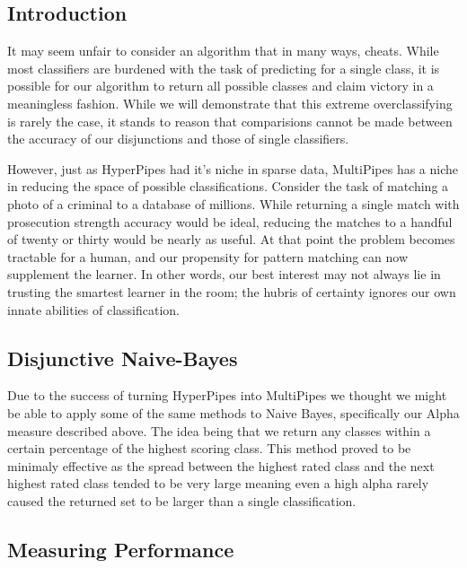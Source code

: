 \subsection{Introduction}
It may seem unfair to consider an algorithm that in many ways, cheats. While most classifiers are burdened with the task of predicting for a single class, it is possible for our algorithm to return all possible classes and claim victory in a meaningless fashion. While we will demonstrate that this extreme overclassifying is rarely the case, it stands to reason that comparisions cannot be made between the accuracy of our disjunctions and those of single classifiers.

However, just as HyperPipes had it's niche in sparse data, MultiPipes has a niche in reducing the space of possible classifications. Consider the task of matching a photo of a criminal to a database of millions. While returning a single match with prosecution strength accuracy would be ideal, reducing the matches to a handful of twenty or thirty would be nearly as useful. At that point the problem becomes tractable for a human, and our propensity for pattern matching can now supplement the learner. In other words, our best interest may not always lie in trusting the smartest learner in the room; the hubris of certainty ignores our own innate abilities of classification.

\subsection{Disjunctive Naive-Bayes}
Due to the success of turning HyperPipes into MultiPipes we thought we might be able to apply some of the same methods to Naive Bayes, specifically our Alpha measure described above. The idea being that we return any classes within a certain percentage of the highest scoring class. This method proved to be minimaly effective as the spread between the highest rated class and the next highest rated class tended to be very large meaning even a high alpha rarely caused the returned set to be larger than a single classification.
\subsection{Measuring Performance}
